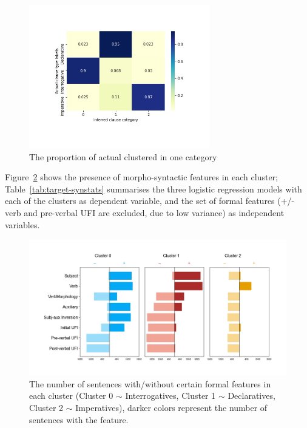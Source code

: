 \begin{figure}[H]
    \centering
    \includegraphics[width=0.7\textwidth]{figures/target-heatrev.jpg}
    \caption{The proportion of actual \diis{} clustered in one category}
    \label{fig:target-heatrev}
\end{figure}


Figure~\ref{fig:target-syncluster} shows the presence of morpho-syntactic features in each cluster; Table~\ref{tab:target-synstats} summarises the three logistic regression models with each of the clusters as dependent variable, and the set of formal features (+/- verb and pre-verbal UFI are excluded, due to low variance) as independent variables.  

\begin{figure}[H]
    \centering
    \includegraphics[width=1\textwidth]{figures/target-syncluster.jpg}
    \caption{The number of sentences with/without certain formal features in each cluster (Cluster 0 $\sim$ Interrogatives, Cluster 1 $\sim$ Declaratives, Cluster 2 $\sim$ Imperatives), darker colors represent the number of sentences with the feature.}
    \label{fig:target-syncluster}
\end{figure}



